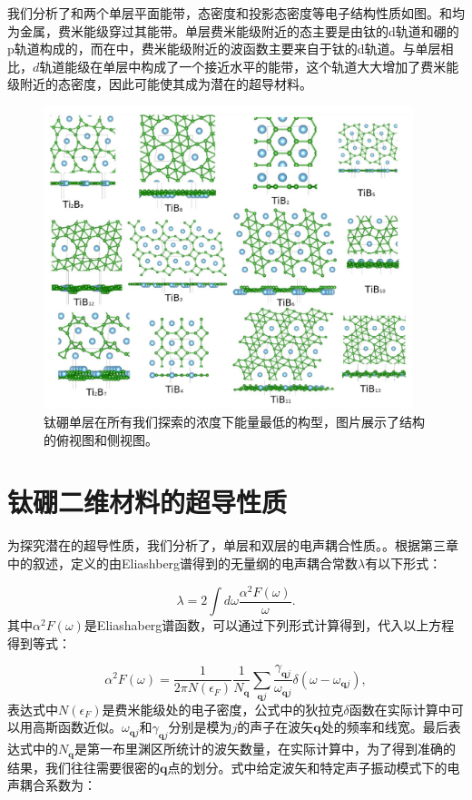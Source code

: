 我们分析了和两个单层平面能带，态密度和投影态密度等电子结构性质如图。和均为金属，费米能级穿过其能带。单层费米能级附近的态主要是由钛的d轨道和硼的p轨道构成的，而在中，费米能级附近的波函数主要来自于钛的d轨道。与单层相比，$d$轨道能级在单层中构成了一个接近水平的能带，这个轨道大大增加了费米能级附近的态密度，因此可能使其成为潜在的超导材料。

\begin{figure}
  \includegraphics[width=0.96\textwidth]{figs/ch5_all_configs.png}
  \centering
  \caption{钛硼单层在所有我们探索的浓度下能量最低的构型，图片展示了结构的俯视图和侧视图。}
  \label{fig:ch5_all_configs}
\end{figure}

\section{钛硼二维材料的超导性质}
为探究潜在的超导性质，我们分析了，单层和双层的电声耦合性质。。根据第三章中的叙述，定义的由Eliashberg谱得到的无量纲的电声耦合常数$\lambda$有以下形式：

\begin{equation}\label{eq:lambda_coupling}
  \lambda = 2 \int d\omega \frac{\alpha^2 F(\omega)}{\omega}.
\end{equation}
其中$\alpha^2 F(\omega)$是Eliashaberg谱函数，可以通过下列形式计算得到，代入以上方程得到等式：

\begin{equation}\label{eq:elishaberg_calc}
  \alpha^2 F(\omega) = \frac{1}{2\pi N(\epsilon_F)}\frac{1}{N_{\bm{q}}}
  \sum_{\bm{q}j} \frac{\gamma_{\bm{q}j}}{\omega_{\bm{q}j}}
  \delta(\omega-\omega_{\bm{q}j}),
\end{equation}
表达式中$N(\epsilon_F)$是费米能级处的电子密度，公式中的狄拉克$\delta$函数在实际计算中可以用高斯函数近似。$\omega_{\bm{q}j}$和$\gamma_{\bm{q}j}$分别是模为$j$的声子在波矢$\bm{q}$处的频率和线宽。最后表达式中的$N_{\bm{q}}$是第一布里渊区所统计的波矢数量，在实际计算中，为了得到准确的结果，我们往往需要很密的$\bm{q}$点的划分。式中给定波矢和特定声子振动模式下的电声耦合系数为：


